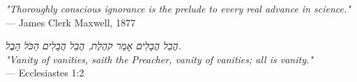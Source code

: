 \begin{flushright}
\emph{"Thoroughly conscious ignorance is the prelude to every real advance in science."}\\
— James Clerk Maxwell, 1877
\end{flushright}
\vspace{2em}
\begin{flushright}
\emph{\texthebrew{הֲבֵל הֲבָלִים אָמַר קֹהֶלֶת, הֲבֵל הֲבָלִים הַכֹּל הָבֶל.}}\\
\emph{"Vanity of vanities, saith the Preacher, vanity of vanities; all is vanity."}\\
— Ecclesiastes 1:2
\end{flushright}


